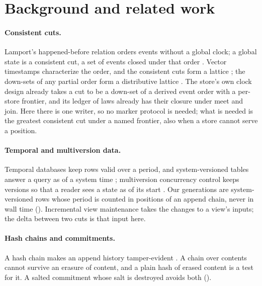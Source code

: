 \documentclass[11pt]{article}
\theoremstyle{plain}
\theoremstyle{definition}
\begin{document}
\section{Background and related work}

\paragraph{Consistent cuts.}
Lamport's happened-before relation \cite{lamport1978time} orders events without a global clock; a
global state is a consistent cut, a set of events closed under that order
\cite{chandy1985snapshots}. Vector timestamps characterize the order, and the consistent cuts
form a lattice \cite{mattern1989virtual}; the down-sets of any partial order form a distributive
lattice \cite{birkhoff1937rings,davey2002lattices}. The store's own clock design already takes a
cut to be a down-set of a derived event order with a per-store frontier, and its ledger of laws
already has their closure under meet and join. Here there is one writer, so no marker protocol
is needed; what is needed is the greatest consistent cut under a named frontier, also when a
store cannot serve a position.

\paragraph{Temporal and multiversion data.}
Temporal databases keep rows valid over a period, and system-versioned tables answer a query as
of a system time \cite{snodgrass1999temporal,kulkarni2012sql2011}; multiversion concurrency
control keeps versions so that a reader sees a state as of its start
\cite{reed1978naming,bernstein1983mvcc}. Our generations are system-versioned rows whose period
is counted in positions of an append chain, never in wall time (). Incremental
view maintenance \cite{gupta1995views} takes the changes to a view's inputs; the delta between
two cuts is that input here.

\paragraph{Hash chains and commitments.}
A hash chain makes an append history tamper-evident
\cite{merkle1987signature,haber1991timestamp}. A chain over contents cannot survive an erasure of
content, and a plain hash of erased content is a test for it. A salted commitment
\cite{halevi1996commitment} whose salt is destroyed avoids both ().
\end{document}
